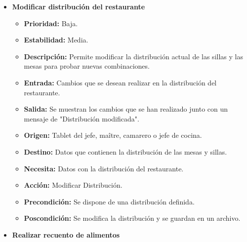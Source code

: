 \documentclass[spanish,a4paper,11pt, twoside]{report}	%
\begin{document}
\begin{itemize}
\begin{itemize}
		\end{itemize}%

		\item \textbf{Modificar distribución del restaurante} %

		\begin{itemize}
			\item \textbf{Prioridad: } Baja.
			\item \textbf{Estabilidad: } Media.
			\item \textbf{Descripción: } Permite modificar la distribución actual de las sillas y las mesas para probar nuevas combinaciones.
			\item \textbf{Entrada: } Cambios que se desean realizar en la distribución del restaurante.
			\item \textbf{Salida: } Se muestran los cambios que se han realizado junto con un mensaje de "Distribución modificada".
			\item \textbf{Origen: } Tablet del jefe, maître, camarero o jefe de cocina.
			\item \textbf{Destino: } Datos que contienen la distribución de las mesas y sillas.
			\item \textbf{Necesita: } Datos con la distribución del restaurante.
			\item \textbf{Acción: } Modificar Distribución.
			\item \textbf{Precondición: } Se dispone de una distribución definida.
			\item \textbf{Poscondición: } Se modifica la distribución y se guardan en un archivo.

		\end{itemize}%

		\item \textbf{Realizar recuento de alimentos} %


\end{itemize}
\end{document}
